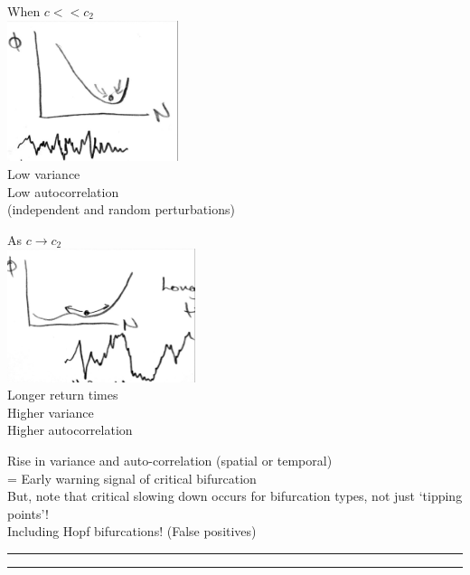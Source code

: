 \documentclass{article}
\newcommand{\ind}{\-\hspace{1cm}}
\begin{document}
\begin{minipage}[t]{0.5\textwidth}
\begin{center}
	When $c < < c_2$\\
 	\includegraphics[width=5cm]{figs/Exploitation_Low.pdf}\\
 	Low variance\\
 	Low autocorrelation\\
 	\ind (independent and random perturbations)
\end{center}
\end{minipage}
\begin{minipage}[t]{0.5\textwidth}
\begin{center}
	As $c \to c_2$\\
 	\includegraphics[width=5.5cm]{figs/Exploitation_High.pdf}\\
 	Longer return times\\
 	Higher variance\\
 	Higher autocorrelation
 	
\end{center}
\end{minipage}

\vspace{0.5cm}

Rise in variance and auto-correlation  (spatial or temporal)\\
\ind	= Early warning signal of critical bifurcation\\
	
But, note that critical slowing down occurs for bifurcation types, not just `tipping points'!\\
\ind Including Hopf bifurcations! \ind (False positives)



\rule[0.5ex]{\linewidth}{1pt}
\rule[0.5ex]{\linewidth}{1pt}
\end{document}
